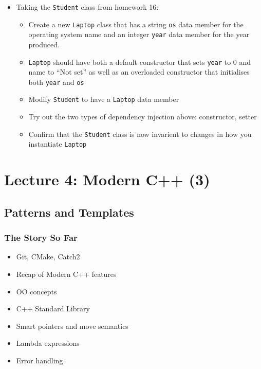 \begin{itemize}
\tightlist
\item
  Taking the \texttt{Student} class from homework 16:

  \begin{itemize}
  \tightlist
  \item
    Create a new \texttt{Laptop} class that has a string \texttt{os}
    data member for the operating system name and an integer
    \texttt{year} data member for the year produced.
  \item
    \texttt{Laptop} should have both a default constructor that sets
    \texttt{year} to 0 and name to ``Not set'' as well as an overloaded
    constructor that initialises both \texttt{year} and \texttt{os}
  \item
    Modify \texttt{Student} to have a \texttt{Laptop} data member
  \item
    Try out the two types of dependency injection above: constructor,
    setter
  \item
    Confirm that the \texttt{Student} class is now invarient to changes
    in how you instantiate \texttt{Laptop}
  \end{itemize}
\end{itemize}

\hypertarget{lecture-4-modern-c-3}{%
\section{Lecture 4: Modern C++ (3)}\label{lecture-4-modern-c-3}}

\hypertarget{patterns-and-templates}{%
\subsection{Patterns and Templates}\label{patterns-and-templates}}

\hypertarget{the-story-so-far-2}{%
\subsubsection{The Story So Far}\label{the-story-so-far-2}}

\begin{itemize}
\tightlist
\item
  Git, CMake, Catch2
\item
  Recap of Modern C++ features
\item
  OO concepts
\item
  C++ Standard Library
\item
  Smart pointers and move semantics
\item
  Lambda expressions
\item
  Error handling
\end{itemize}

